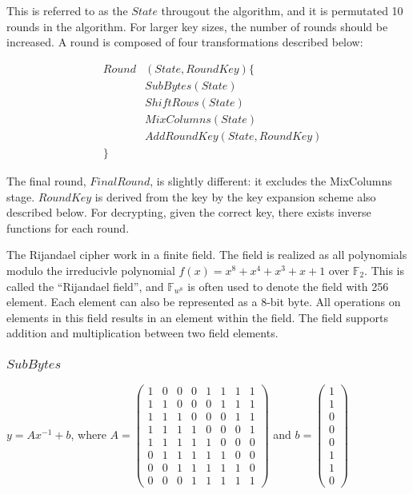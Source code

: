 This is referred to as the $State$ througout the algorithm, and it
is permutated 10 rounds in the algorithm. For larger key sizes, the
number of rounds should be increased. A round is composed of four
transformations described below:

\begin{eqnarray*}
&Round&(State, RoundKey) \{\\
  & &SubBytes (State)\\
  & &ShiftRows (State)\\
  & &MixColumns (State)\\
  & &AddRoundKey (State, RoundKey)\\
&\}&
\end{eqnarray*}

The final round, $FinalRound$, is slightly different: it excludes the
MixColumns stage. $RoundKey$ is derived from the key by the key
expansion scheme also described below. For decrypting, given the
correct key, there exists inverse functions for each round.

The Rijandael cipher work in a finite field. The field is realized as
all polynomials modulo the irreducivle polynomial $f(x) = x^8 + x^4 +
x^3 + x + 1$ over $\mathbb{F}_2$. This is called the ``Rijandael
field'', and $\mathbb{F}_{w^8}$ is often used to denote the field with
256 element. Each element can also be represented as a 8-bit byte. All
operations on elements in this field results in an element within the
field. The field supports addition and multiplication between two
field elements.

\subsubsection{$SubBytes$}

$y = A x^{-1} + b$, where $
  A =
  \begin{pmatrix}
    1 & 0 & 0 & 0 & 1 & 1 & 1 & 1 \\
    1 & 1 & 0 & 0 & 0 & 1 & 1 & 1 \\
    1 & 1 & 1 & 0 & 0 & 0 & 1 & 1 \\
    1 & 1 & 1 & 1 & 0 & 0 & 0 & 1 \\
    1 & 1 & 1 & 1 & 1 & 0 & 0 & 0 \\
    0 & 1 & 1 & 1 & 1 & 1 & 0 & 0 \\
    0 & 0 & 1 & 1 & 1 & 1 & 1 & 0 \\
    0 & 0 & 0 & 1 & 1 & 1 & 1 & 1
  \end{pmatrix}$ and $
  b = 
  \begin{pmatrix}
    1\\1\\0\\0\\0\\1\\1\\0
  \end{pmatrix}$


